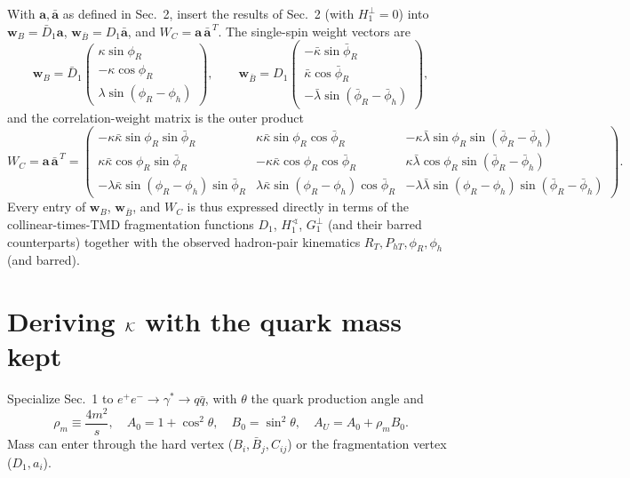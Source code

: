 \documentclass[10pt]{article}
\begin{document}
With \(\mathbf a,\bar{\mathbf a}\) as defined in Sec.~2, insert the
results of Sec.~2 (with \(H_1^\perp=0\)) into
\(\mathbf w_B=\bar D_1\mathbf a\), \(\mathbf w_{\bar B}=D_1\bar{\mathbf a}\),
and \(W_C=\mathbf a\,\bar{\mathbf a}^{\,T}\).  The single-spin weight
vectors are
\[
\mathbf w_B=\bar D_1
\begin{pmatrix}\kappa\sin\phi_R\\-\kappa\cos\phi_R\\
\lambda\sin(\phi_R-\phi_h)\end{pmatrix},
\qquad
\mathbf w_{\bar B}=D_1
\begin{pmatrix}-\bar\kappa\sin\bar\phi_R\\\bar\kappa\cos\bar\phi_R\\
-\bar\lambda\sin(\bar\phi_R-\bar\phi_h)\end{pmatrix},
\]
and the correlation-weight matrix is the outer product
\[
W_C=\mathbf a\,\bar{\mathbf a}^{\,T}=
\begin{pmatrix}
-\kappa\bar\kappa\sin\phi_R\sin\bar\phi_R &
\kappa\bar\kappa\sin\phi_R\cos\bar\phi_R &
-\kappa\bar\lambda\sin\phi_R\sin(\bar\phi_R-\bar\phi_h)
\\[2pt]
\kappa\bar\kappa\cos\phi_R\sin\bar\phi_R &
-\kappa\bar\kappa\cos\phi_R\cos\bar\phi_R &
\kappa\bar\lambda\cos\phi_R\sin(\bar\phi_R-\bar\phi_h)
\\[2pt]
-\lambda\bar\kappa\sin(\phi_R-\phi_h)\sin\bar\phi_R &
\lambda\bar\kappa\sin(\phi_R-\phi_h)\cos\bar\phi_R &
-\lambda\bar\lambda\sin(\phi_R-\phi_h)\sin(\bar\phi_R-\bar\phi_h)
\end{pmatrix} .
\]
Every entry of \(\mathbf w_B\), \(\mathbf w_{\bar B}\), and \(W_C\) is thus
expressed directly in terms of the collinear-times-TMD fragmentation
functions \(D_1\), \(H_1^{\sphericalangle}\), \(G_1^\perp\) (and their
barred counterparts) together with the observed hadron-pair kinematics
\(R_T,P_{hT},\phi_R,\phi_h\) (and barred).

\section{Deriving \({\cal K}\) with the quark mass kept}

Specialize Sec.~1 to \(e^+e^-\to\gamma^*\to q\bar q\), with \(\theta\)
the quark production angle and
\[
\rho_m\equiv\frac{4m^2}{s},
\quad
A_0=1+\cos^2\theta,
\quad
B_0=\sin^2\theta,
\quad
A_U=A_0+\rho_mB_0 .
\]
Mass can enter through the hard vertex (\(B_i,\bar B_j,C_{ij}\)) or the
fragmentation vertex (\(D_1,a_i\)).
\end{document}
